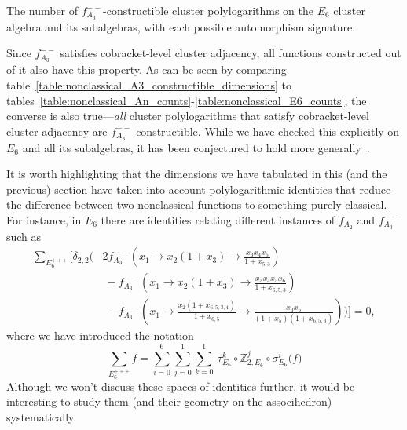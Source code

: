 \documentclass[12pt]{article}
\begin{document}
\begin{table}
\begin{center}
\end{center}

\caption{The number of $f_{A_3}^{--}$-constructible cluster polylogarithms on the $E_6$ cluster algebra and its subalgebras, with each possible automorphism signature.}
\label{table:nonclassical_A3_constructible_dimensions}
\end{table}

Since $f_{A_3}^{--}$ satisfies cobracket-level cluster adjacency, all functions constructed out of it also have this property. As can be seen by comparing table~\ref{table:nonclassical_A3_constructible_dimensions} to tables~\ref{table:nonclassical_An_counts}-\ref{table:nonclassical_E6_counts}, the converse is also true---\emph{all} cluster polylogarithms that satisfy cobracket-level cluster adjacency are $f_{A_3}^{--}$-constructible. While we have checked this explicitly on $E_6$ and all its subalgebras, it has been conjectured to hold more generally~\cite{Golden:2014xqa}. 

It is worth highlighting that the dimensions we have tabulated in this (and the previous) section have taken into account polylogarithmic identities that reduce the difference between two nonclassical functions to something purely classical. For instance, in $E_6$ there are identities relating different instances of $f_{A_2}$ and $f_{A_3}^{--}$ such as
\begin{align}
\sum_{E_6^{+++}} \Bigg[ \delta_{2,2}\Bigg(&2 f_{A_3}^{--}\left(x_1 \to x_2 (1 + x_3)\to \frac{x_3 x_4 x_5}{1 + x_{5,3}} \right)  \\
& \ - f_{A_3}^{--}\left(x_1\to x_2 (1 + x_3)\to \frac{x_3 x_4 x_5 x_6}{1 + x_{6,5,3}} \right) \nonumber  \\ 
&\ - f_{A_3}^{--}\left(x_1\to \frac{x_2 (1 + x_{6,5,3,4})}{1 + x_{6,5}}\to \frac{x_3 x_5}{(1 + x_5) (1 + x_{6,5,3})}\right)  \Bigg) \Bigg] = 0, \nonumber
\end{align}
where we have introduced the notation
\begin{equation}
\sum_{E_6^{+++}} f = \sum_{i=0}^6\sum_{j=0}^1\sum_{k=0}^1 \ \tau_{E_6}^k \circ \mathbb{Z}_{2,E_6}^j \circ \sigma_{E_6}^i \big( f \big)
\end{equation}
Although we won't discuss these spaces of identities further, it would be interesting to study them (and their geometry on the associhedron) systematically. 
\end{document}
